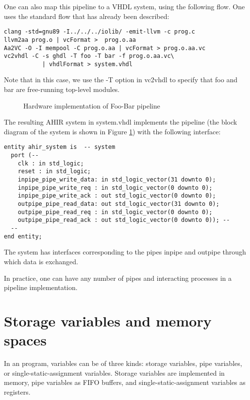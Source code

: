 One can also map this pipeline to a VHDL system, using the
following flow.  One uses the standard flow that has already
been described:
\begin{verbatim}
clang -std=gnu89 -I../../../iolib/ -emit-llvm -c prog.c
llvm2aa prog.o | vcFormat >  prog.o.aa
Aa2VC -O -I mempool -C prog.o.aa | vcFormat > prog.o.aa.vc
vc2vhdl -C -s ghdl -T foo -T bar -f prog.o.aa.vc\
           | vhdlFormat > system.vhdl
\end{verbatim}
Note that in this case, we use the -T option in vc2vhdl to
specify that foo and bar are free-running top-level modules.
\begin{figure}
\begin{centering}
\centerline{}
\caption{Hardware implementation of Foo-Bar pipeline}
 \label{fig:FooBarPipeline}
\end{centering}
\end{figure}
The resulting AHIR system in system.vhdl implements the pipeline
(the block diagram of the system is shown in Figure \ref{fig:FooBarPipeline})
with the following interface:
\begin{verbatim}
entity ahir_system is  -- system 
  port (-- 
    clk : in std_logic;
    reset : in std_logic;
    inpipe_pipe_write_data: in std_logic_vector(31 downto 0);
    inpipe_pipe_write_req : in std_logic_vector(0 downto 0);
    inpipe_pipe_write_ack : out std_logic_vector(0 downto 0);
    outpipe_pipe_read_data: out std_logic_vector(31 downto 0);
    outpipe_pipe_read_req : in std_logic_vector(0 downto 0);
    outpipe_pipe_read_ack : out std_logic_vector(0 downto 0)); -- 
  -- 
end entity;
\end{verbatim}
The system has interfaces corresponding to the pipes inpipe and
outpipe through which data is exchanged.

In practice, one can have any number of pipes and 
interacting processes in a pipeline implementation.


\section{Storage variables and memory spaces}


In an \Aa program, variables can be of three kinds:
storage variables, pipe variables, or single-static-assignment
variables.  Storage variables are implemented in memory,
pipe variables as FIFO buffers, and single-static-assignment
variables as registers.  

